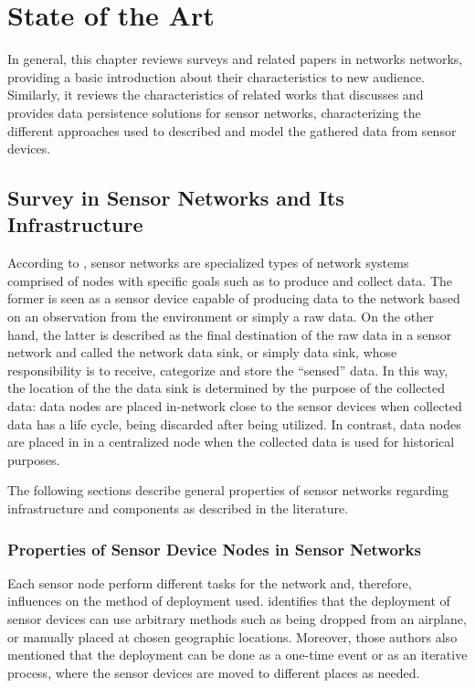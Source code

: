 

\chapter{State of the Art}

In general, this chapter reviews surveys and related papers in networks
networks, providing a basic introduction about their characteristics to new 
audience. Similarly, it reviews the characteristics of related works that
discusses and provides data persistence solutions for sensor networks, 
characterizing the different approaches used to described and model the
gathered data from sensor devices.

\section{Survey in Sensor Networks and Its Infrastructure}

According to \cite{sn-intro02}, sensor networks are specialized types of
network systems comprised of nodes with specific goals such as to produce and
collect data. The former is seen as a sensor device capable of producing data
to the network based on an observation from the environment or simply a raw
data. On the other hand, the latter is described as the final destination of
the raw data in a sensor network and called the network data sink, or simply
data sink, whose responsibility is to receive, categorize and store the
``sensed'' data. In this way, the location of the the data sink is determined by
the purpose of the collected data: data nodes are placed in-network close to
the sensor devices when collected data has a life cycle, being discarded after
being utilized. In contrast, data nodes are placed in in a centralized node
when the collected data is used for historical purposes. 

The following sections describe general properties of sensor networks regarding
infrastructure and components as described in the literature.

\subsection{Properties of Sensor Device Nodes in Sensor Networks}

Each sensor node perform different tasks for the network and, therefore,
influences on the method of deployment used. \cite{sn-intro01} identifies that
the deployment of sensor devices can use arbitrary methods such as being
dropped from an airplane, or manually placed at chosen geographic locations.
Moreover, those authors also mentioned that the deployment can be done as a
one-time event or as an iterative process, where the sensor devices are moved
to different places as needed.

